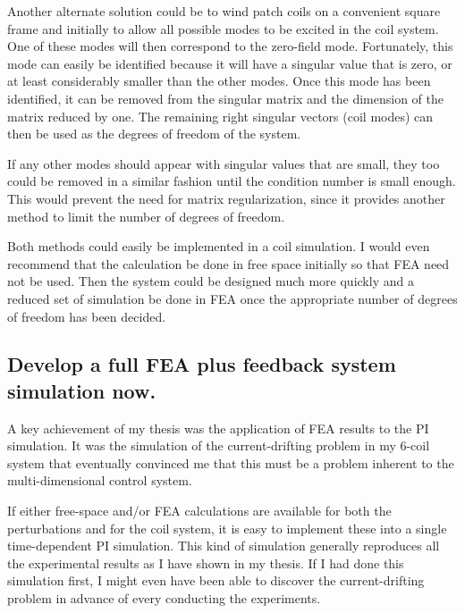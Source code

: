 Another alternate solution could be to wind patch coils on a convenient square frame and initially to allow all possible modes to be excited in the coil system.  One of these modes will then correspond to the zero-field mode.  Fortunately, this mode can easily be identified because it will have a singular value that is zero, or at least considerably smaller than the other modes.  Once this mode has been identified, it can be removed from the singular matrix and the dimension of the matrix reduced by one.  The remaining right singular vectors (coil modes) can then be used as the degrees of freedom of the system.

If any other modes should appear with singular values that are small, they too could be removed in a similar fashion until the condition number is small enough.  This would prevent the need for matrix regularization, since it provides another method to limit the number of degrees of freedom.

Both methods could easily be implemented in a coil simulation. I would even recommend that the calculation be done in free space initially so that FEA need not be used. Then the system could be designed much more quickly and a reduced set of simulation be done in FEA once the appropriate number of degrees of freedom has been decided.

\subsection{Develop a full FEA plus feedback system simulation now.}

A key achievement of my thesis was the application of FEA results to the PI simulation. It was the simulation of the current-drifting problem in my 6-coil system that eventually convinced me that this must be a problem inherent to the multi-dimensional control system. 

If either free-space and/or FEA calculations are available for both the perturbations and for the coil system, it is easy to implement these into a single time-dependent PI simulation. This kind of simulation generally reproduces all the experimental results as I have shown in my thesis. If I had done this simulation first, I might even have been able to discover the current-drifting problem in advance of every conducting the experiments.


